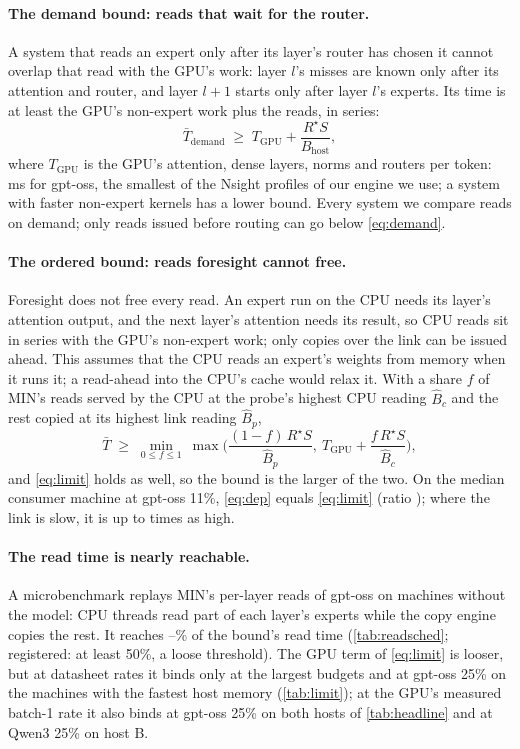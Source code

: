 \paragraph{The demand bound: reads that wait for the router.} A system that reads an expert only after its layer's router
has chosen it cannot overlap that read with the GPU's work: layer $l$'s misses are known only after its attention and
router, and layer $l{+}1$ starts only after layer $l$'s experts. Its time is at least the GPU's non-expert work plus the
reads, in series:
\begin{equation}
\bar T_{\text{demand}} \;\ge\; T_{\text{GPU}} + \frac{R^\star S}{B_{\mathrm{host}}},
\label{eq:demand}
\end{equation}
where $T_{\text{GPU}}$ is the GPU's attention, dense layers, norms and routers per token: \dmTgpu\,ms for gpt-oss, the
smallest of the \slProfN{} Nsight profiles of our engine we use; a system with faster non-expert kernels has a lower bound. Every system we compare reads on demand; only reads issued before routing can go below
\cref{eq:demand}.

\paragraph{The ordered bound: reads foresight cannot free.} Foresight does not free every read. An expert run on the CPU needs
its layer's attention output, and the next layer's attention needs its result, so CPU reads sit in series with the GPU's
non-expert work; only copies over the link can be issued ahead. This assumes that the CPU reads an expert's weights from
memory when it runs it; a read-ahead into the CPU's cache would relax it. With a share $f$ of MIN's reads served by the
CPU at the probe's highest CPU reading $\hat B_c$ and the rest copied at its highest link reading $\hat B_p$,
\begin{equation}
\bar T \;\ge\; \min_{0\le f\le 1}\ \max\!\Big(\frac{(1-f)\,R^\star S}{\hat B_p},\ T_{\text{GPU}} + \frac{f\,R^\star S}{\hat B_c}\Big),
\label{eq:dep}
\end{equation}
and \cref{eq:limit} holds as well, so the bound is the larger of the two.
On the median consumer machine at gpt-oss 11\%, \cref{eq:dep} equals \cref{eq:limit} (ratio \dcDepOverLimLowMed); where
the link is slow, it is up to \dcDepOverLimLowMax{} times as high.

\paragraph{The read time is nearly reachable.} A microbenchmark replays MIN's per-layer reads of gpt-oss on
\jdHosts{} machines without the model: CPU threads read part of each layer's experts while the copy engine copies the rest.
It reaches \jdLayerMin--\jdLayerMax\% of the bound's read time (\cref{tab:readsched}; registered: at least 50\%, a loose threshold). The GPU term of \cref{eq:limit} is
looser, but at datasheet rates it binds only at the largest budgets and at gpt-oss 25\% on the machines with the
fastest host memory (\cref{tab:limit}); at the GPU's measured batch-1 rate it also binds at gpt-oss 25\% on both hosts of
\cref{tab:headline} and at Qwen3 25\% on host B.

